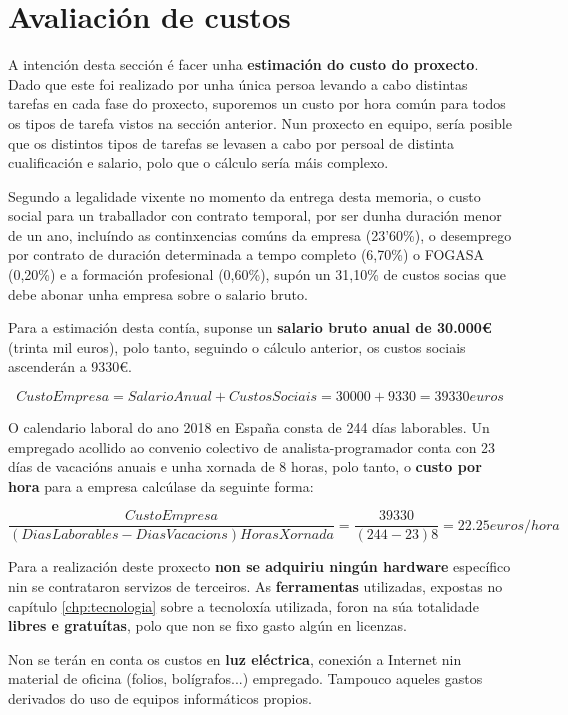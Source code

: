 \section{Avaliación de custos}

A intención desta sección é facer unha \textbf{estimación do custo do proxecto}. Dado que este foi realizado por unha única persoa levando a cabo distintas tarefas en cada fase do proxecto, suporemos un custo por hora común para todos os tipos de tarefa vistos na sección anterior. Nun proxecto en equipo, sería posible que os distintos tipos de tarefas se levasen a cabo por persoal de distinta cualificación e salario, polo que o cálculo sería máis complexo.

Segundo a legalidade vixente no momento da entrega desta memoria, o custo social para un traballador con contrato temporal, por ser dunha duración menor de un ano, incluíndo as continxencias comúns da empresa (23'60\%), o desemprego por contrato de duración determinada a tempo completo (6,70\%) o FOGASA (0,20\%) e a formación profesional (0,60\%), supón un 31,10\% de custos socias que debe abonar unha empresa sobre o salario bruto\cite{custo}.

Para a estimación desta contía, suponse un \textbf{salario bruto anual de 30.000€} (trinta mil euros), polo tanto, seguindo o cálculo anterior, os custos sociais ascenderán a 9330€. 

\[ CustoEmpresa = SalarioAnual + CustosSociais = 30000 + 9330 = 39330 euros \]

 O calendario laboral do ano 2018 en España consta de 244 días laborables. Un empregado acollido ao convenio colectivo de analista-programador conta con 23 días de vacacións anuais e unha xornada de 8 horas, polo tanto, o \textbf{custo por hora} para a empresa calcúlase da seguinte forma:

\[ \dfrac{CustoEmpresa}{(DiasLaborables - DiasVacacions) HorasXornada} = \dfrac{39330}{(244 - 23) 8} = 22.25 euros/hora \]

Para a realización deste proxecto \textbf{non se adquiriu ningún hardware} específico nin se contrataron servizos de terceiros. As \textbf{ferramentas} utilizadas, expostas no capítulo \ref{chp:tecnologia} sobre a tecnoloxía utilizada, foron na súa totalidade \textbf{libres e gratuítas}, polo que non se fixo gasto algún en licenzas.

Non se terán en conta os custos en \textbf{luz eléctrica}, conexión a Internet nin material de oficina (folios, bolígrafos...) empregado. Tampouco aqueles gastos derivados do uso de equipos informáticos propios.

